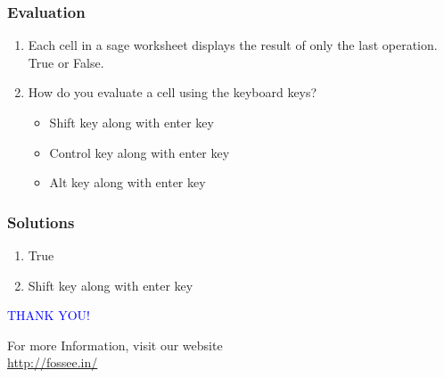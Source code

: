 \documentclass[presentation]{beamer}
\begin{document}
\begin{frame}
\frametitle{Evaluation}
\label{sec-6}


\begin{enumerate}
\item Each cell in a sage worksheet displays the result of only the last
     operation.\\
     True or False.
\vspace{12pt}
\item How do you evaluate a cell using the keyboard keys?
\begin{itemize}
\item Shift key along with enter key
\item Control key along with enter key
\item Alt key along with enter key
\end{itemize}
\end{enumerate}
\end{frame}
\begin{frame}
\frametitle{Solutions}
\label{sec-7}


\begin{enumerate}
\item True
\vspace{12pt}
\item Shift key along with enter key
\end{enumerate}
\end{frame}
\begin{frame}

  \begin{block}{}
  \begin{center}
  \textcolor{blue}{\Large THANK YOU!} 
  \end{center}
  \end{block}
\begin{block}{}
  \begin{center}
    For more Information, visit our website\\
    \url{http://fossee.in/}
  \end{center}  
  \end{block}
\end{frame}
\end{document}
